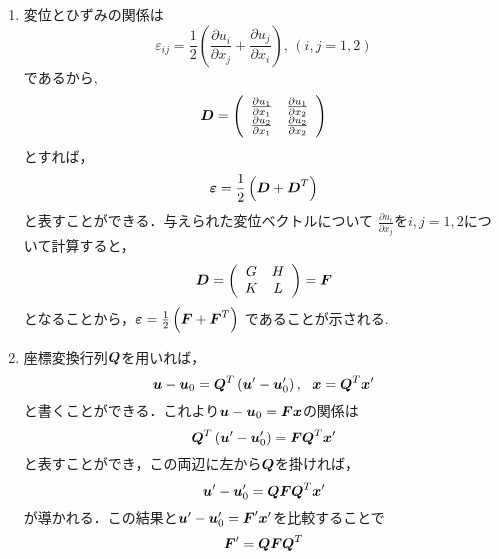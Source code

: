 \documentclass[10pt,a4j]{jarticle}
\begin{document}
\begin{enumerate}
\item
変位とひずみの関係は
	\begin{equation}
		\varepsilon_{ij}=\frac{1}{2} 
		\left(
		\frac{\partial u_i}{\partial x_j}
		+
		\frac{\partial u_j}{\partial x_i}
		\right), \, (i,j=1,2)
	\end{equation}
	であるから,
	\begin{equation}
		\mbox{\boldmath $D$}=
		\left(
		\begin{array}{cc}
			\frac{\partial u_1}{\partial x_1} &
			\frac{\partial u_1}{\partial x_2}  \\
			\frac{\partial u_2}{\partial x_1} &
			\frac{\partial u_2}{\partial x_2} 
		\end{array}
		\right)
	\end{equation}
	とすれば，
	\begin{equation}
		\mbox{\boldmath $\varepsilon$}=\frac{1}{2}
		\left( \mbox{\boldmath $D$} +\mbox{\boldmath $D$}^T\right)
	\end{equation}
	と表すことができる．与えられた変位ベクトルについて
	$\frac{\partial u_i}{\partial x_j}$を$i,j=1,2$につ
	いて計算すると，
	\begin{equation}
		\mbox{\boldmath $D$}=
		\left(
		\begin{array}{cc}
			G & H \\
			K & L 
		\end{array}
		\right)
		=\mbox{\boldmath $F$}
	\end{equation}
	となることから，$\mbox{\boldmath $\varepsilon$}=\frac{1}{2}\left(\mbox{\boldmath $F$}+\mbox{\boldmath $F$}^T\right)$
	であることが示される.
\item
	座標変換行列$\mbox{\boldmath $Q$}$を用いれば，
	\begin{equation}
		\fat{u}-\fat{u}_0= \fat{Q}^T \left( \fat{u}'-\fat{u}_0'\right), \ \ 
		\fat{x}=\fat{Q}^T \fat{x}'
	\end{equation}
	と書くことができる．これより$\mbox{\boldmath $u$}-\mbox{\boldmath $u$}_0 = \mbox{\boldmath $Fx$}$の関係は
	\begin{equation}
		\mbox{\boldmath $Q$}^T \left( \mbox{\boldmath $u$}'-\mbox{\boldmath $u$}_0'\right)
		=
		\mbox{\boldmath $F$}\mbox{\boldmath $Q$}^T \mbox{\boldmath $x$}'
	\end{equation}
	と表すことができ，この両辺に左から$\mbox{\boldmath $Q$}$を掛ければ，
	\begin{equation}
		\mbox{\boldmath $u$}'-\mbox{\boldmath $u$}_0'
		=
		\mbox{\boldmath $Q$}\mbox{\boldmath $F$}\mbox{\boldmath $Q$}^T \mbox{\boldmath $x$}'
	\end{equation}
	が導かれる．この結果と$\mbox{\boldmath $u$}'-\mbox{\boldmath $u$}_0' = \mbox{\boldmath $F$}'\mbox{\boldmath $x$}'$を比較することで
	\begin{equation}
		\mbox{\boldmath $F$}'=\mbox{\boldmath $Q$} \mbox{\boldmath $F$}\mbox{\boldmath $Q$}^T
		\label{eqn:F2Fd}
	\end{equation}

\end{enumerate}
\end{document}
